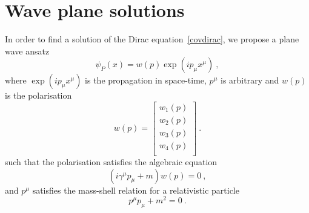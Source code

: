 \chapter{Wave plane solutions}

    In order to find a solution of the Dirac equation~\eqref{covdirac}, we propose a plane wave ansatz 
    \begin{equation*}
        \psi_P(x) = w (p) \exp(i p_\mu x^\mu) ~,
    \end{equation*}
    where $\exp(i p_\mu x^\mu)$ is the propagation in space-time, $p^\mu$ is arbitrary and $w(p)$ is the polarisation 
    \begin{equation*}
        w(p) = \begin{bmatrix}
            w_1(p) \\ w_2(p) \\ w_3(p) \\ w_4(p) \\
        \end{bmatrix} ~.
    \end{equation*}
    such that the polarisation satisfies the algebraic equation 
    \begin{equation}\label{pol}
        (i \gamma^\mu p_\mu + m ) w(p) = 0 ~,
    \end{equation}
    and $p^\mu$ satisfies the mass-shell relation for a relativistic particle
    \begin{equation*}
        p^\mu p_\mu + m^2 = 0~.
    \end{equation*}
